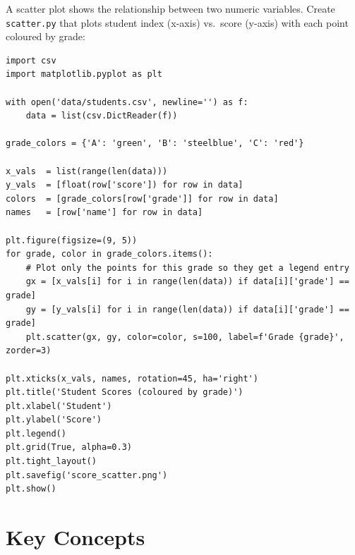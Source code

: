 \documentclass{cslab}
\begin{document}
A scatter plot shows the relationship between two numeric variables. Create \texttt{scatter.py} that plots student index (x-axis) vs.\ score (y-axis) with each point coloured by grade:

\begin{lstlisting}
import csv
import matplotlib.pyplot as plt

with open('data/students.csv', newline='') as f:
    data = list(csv.DictReader(f))

grade_colors = {'A': 'green', 'B': 'steelblue', 'C': 'red'}

x_vals  = list(range(len(data)))
y_vals  = [float(row['score']) for row in data]
colors  = [grade_colors[row['grade']] for row in data]
names   = [row['name'] for row in data]

plt.figure(figsize=(9, 5))
for grade, color in grade_colors.items():
    # Plot only the points for this grade so they get a legend entry
    gx = [x_vals[i] for i in range(len(data)) if data[i]['grade'] == grade]
    gy = [y_vals[i] for i in range(len(data)) if data[i]['grade'] == grade]
    plt.scatter(gx, gy, color=color, s=100, label=f'Grade {grade}', zorder=3)

plt.xticks(x_vals, names, rotation=45, ha='right')
plt.title('Student Scores (coloured by grade)')
plt.xlabel('Student')
plt.ylabel('Score')
plt.legend()
plt.grid(True, alpha=0.3)
plt.tight_layout()
plt.savefig('score_scatter.png')
plt.show()
\end{lstlisting}

\section{Key Concepts}
\end{document}
